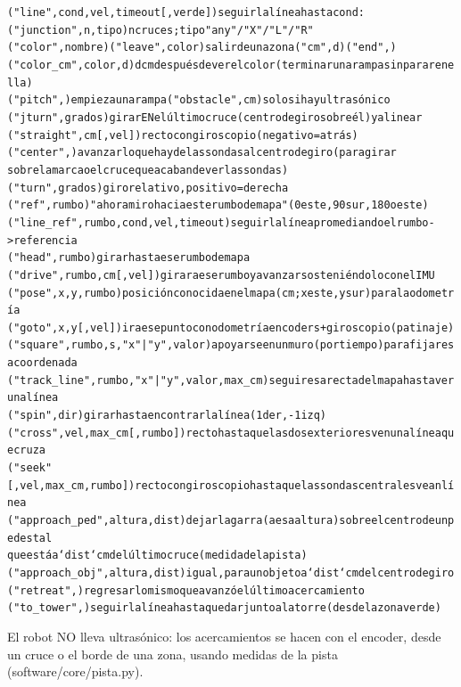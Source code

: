 {\small\begin{alltt}
("line", cond, vel, timeout[, verde])  seguir la línea hasta cond:
     ("junction", n, tipo)  n cruces; tipo "any" / "X" / "L" / "R"
     ("color", nombre)  ("leave", color) salir de una zona  ("cm", d)  ("end",)
     ("color\_cm", color, d)  d cm después de ver el color (terminar una rampa sin parar en ella)
     ("pitch",) empieza una rampa   ("obstacle", cm) solo si hay ultrasónico
("jturn", grados)          girar EN el último cruce (centro de giro sobre él) y alinear
("straight", cm[, vel])    recto con giroscopio (negativo = atrás)
("center",)                avanzar lo que hay de las sondas al centro de giro (para girar
                           sobre la marca o el cruce que acaban de ver las sondas)
("turn", grados)           giro relativo, positivo = derecha
("ref", rumbo)             "ahora miro hacia este rumbo de mapa" (0 este, 90 sur, 180 oeste)
("line\_ref", rumbo, cond, vel, timeout)  seguir la línea promediando el rumbo -> referencia
("head", rumbo)            girar hasta ese rumbo de mapa
("drive", rumbo, cm[, vel])  girar a ese rumbo y avanzar sosteniéndolo con el IMU
("pose", x, y, rumbo)      posición conocida en el mapa (cm; x este, y sur) para la odometría
("goto", x, y[, vel])      ir a ese punto con odometría encoders + giroscopio (patinaje)
("square", rumbo, s, "x"|"y", valor)  apoyarse en un muro (por tiempo) para fijar esa coordenada
("track\_line", rumbo, "x"|"y", valor, max\_cm)  seguir esa recta del mapa hasta ver una línea
("spin", dir)              girar hasta encontrar la línea (1 der, -1 izq)
("cross", vel, max\_cm[, rumbo])  recto hasta que las dos exteriores ven una línea que cruza
("seek"[, vel, max\_cm, rumbo])  recto con giroscopio hasta que las sondas centrales vean línea
("approach\_ped", altura, dist)  dejar la garra (a esa altura) sobre el centro de un pedestal
                           que está a `dist` cm del último cruce (medida de la pista)
("approach\_obj", altura, dist)  igual, para un objeto a `dist` cm del centro de giro
("retreat",)               regresar lo mismo que avanzó el último acercamiento
("to\_tower",)              seguir la línea hasta quedar junto a la torre (desde la zona verde)
\end{alltt}}
El robot NO lleva ultrasónico: los acercamientos se hacen con el encoder, desde un cruce o el borde de una zona, usando medidas de la pista (software/core/pista.py).

